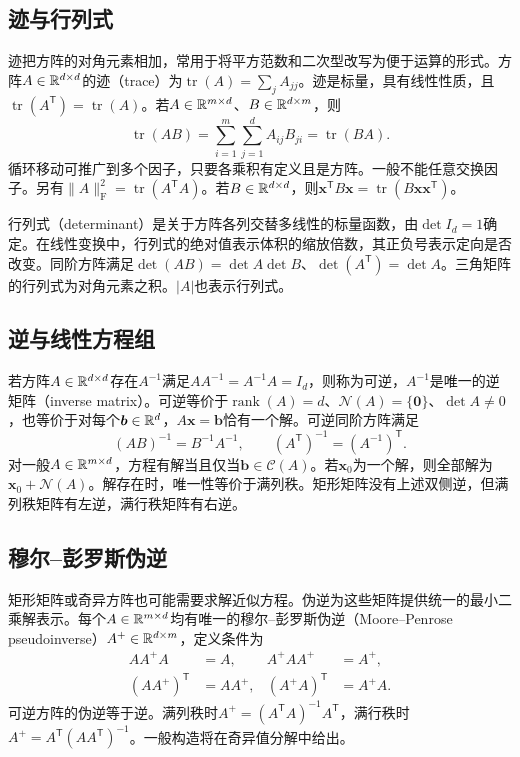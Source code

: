\subsection{迹与行列式}
迹把方阵的对角元素相加，常用于将平方范数和二次型改写为便于运算的形式。方阵$A\in\mathbb{R}^{d\times d}$的迹（trace）为$\operatorname{tr}(A)=\sum_jA_{jj}$。迹是标量，具有线性性质，且$\operatorname{tr}(A^{\mathsf T})=\operatorname{tr}(A)$。若$A\in\mathbb{R}^{m\times d}$、$B\in\mathbb{R}^{d\times m}$，则
\begin{equation}
 \operatorname{tr}(AB)=\sum_{i=1}^m\sum_{j=1}^dA_{ij}B_{ji}=\operatorname{tr}(BA).
\end{equation}
循环移动可推广到多个因子，只要各乘积有定义且是方阵。一般不能任意交换因子。另有$\|A\|_{\mathrm F}^2=\operatorname{tr}(A^{\mathsf T}A)$。若$B\in\mathbb{R}^{d\times d}$，则$\bm x^{\mathsf T}B\bm x=\operatorname{tr}(B\bm x\bm x^{\mathsf T})$。

行列式（determinant）是关于方阵各列交替多线性的标量函数，由$\det I_d=1$确定。在线性变换中，行列式的绝对值表示体积的缩放倍数，其正负号表示定向是否改变。同阶方阵满足$\det(AB)=\det A\det B$、$\det(A^{\mathsf T})=\det A$。三角矩阵的行列式为对角元素之积。$|A|$也表示行列式。

\subsection{逆与线性方程组}
若方阵$A\in\mathbb{R}^{d\times d}$存在$A^{-1}$满足$AA^{-1}=A^{-1}A=I_d$，则称为可逆，$A^{-1}$是唯一的逆矩阵（inverse matrix）。可逆等价于$\operatorname{rank}(A)=d$、$\mathcal N(A)=\{\bm0\}$、$\det A\ne0$，也等价于对每个$\bm b\in\mathbb{R}^d$，$A\bm x=\bm b$恰有一个解。可逆同阶方阵满足
\begin{equation}
 (AB)^{-1}=B^{-1}A^{-1},\qquad (A^{\mathsf T})^{-1}=(A^{-1})^{\mathsf T}.
\end{equation}
对一般$A\in\mathbb{R}^{m\times d}$，方程有解当且仅当$\bm b\in\mathcal C(A)$。若$\bm x_0$为一个解，则全部解为$\bm x_0+\mathcal N(A)$。解存在时，唯一性等价于满列秩。矩形矩阵没有上述双侧逆，但满列秩矩阵有左逆，满行秩矩阵有右逆。

\subsection{穆尔--彭罗斯伪逆}
矩形矩阵或奇异方阵也可能需要求解近似方程。伪逆为这些矩阵提供统一的最小二乘解表示。每个$A\in\mathbb{R}^{m\times d}$均有唯一的穆尔--彭罗斯伪逆（Moore--Penrose pseudoinverse）$A^+\in\mathbb{R}^{d\times m}$，定义条件为
\begin{align}
 AA^+A&=A,&A^+AA^+&=A^+,\\
 (AA^+)^{\mathsf T}&=AA^+,&(A^+A)^{\mathsf T}&=A^+A.
\end{align}
可逆方阵的伪逆等于逆。满列秩时$A^+=(A^{\mathsf T}A)^{-1}A^{\mathsf T}$，满行秩时$A^+=A^{\mathsf T}(AA^{\mathsf T})^{-1}$。一般构造将在奇异值分解中给出。

